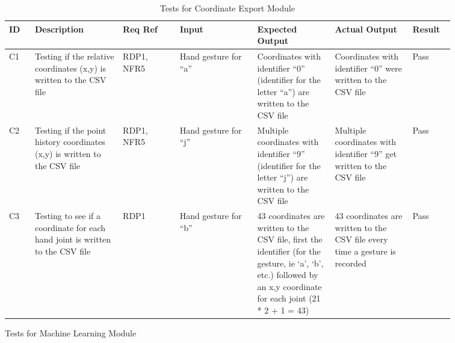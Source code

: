 \documentclass[12pt, titlepage]{article}
\begin{document}
\renewcommand{\arraystretch}{1.2}
\noindent \begin{longtable}{p{0.05\linewidth}|p{0.17\linewidth}|p{0.11\linewidth}|p{0.15\linewidth}|p{0.15\linewidth}|p{0.15\linewidth}|p{0.08\linewidth}}
\hline
\textbf{ID} & \textbf{Description} & \textbf{Req Ref} & \textbf{Input} & \textbf{Expected Output} & \textbf{Actual Output} & \textbf{Result}\\
\hline
C1 & Testing if the relative coordinates (x,y) is written to the CSV file & RDP1, NFR5 & Hand gesture for “a” & Coordinates with identifier “0” (identifier for the letter “a”) are written to the CSV file & Coordinates with identifier “0” were written to the CSV file & Pass\\ \hline
C2 & Testing if the point history coordinates (x,y) is written to the CSV file & RDP1, NFR5 & Hand gesture for “j” & Multiple coordinates with identifier “9” (identifier for the letter “j”) are written to the CSV file & Multiple coordinates with identifier “9” get written to the CSV file & Pass\\ \hline
C3 & Testing to see if a coordinate for each hand joint is written to the CSV file & RDP1 & Hand gesture for “b” & 43 coordinates are written to the CSV file, first the identifier (for the gesture, ie ‘a’, ‘b’, etc.) followed by an x,y coordinate for each joint (21 * 2 + 1 = 43) & 43 coordinates are written to the CSV file every time a gesture is recorded & Pass
\hline
\caption{Tests for Coordinate Export Module}
\end{longtable}

\newpage
\centerline{Tests for Machine Learning Module}
\end{document}
